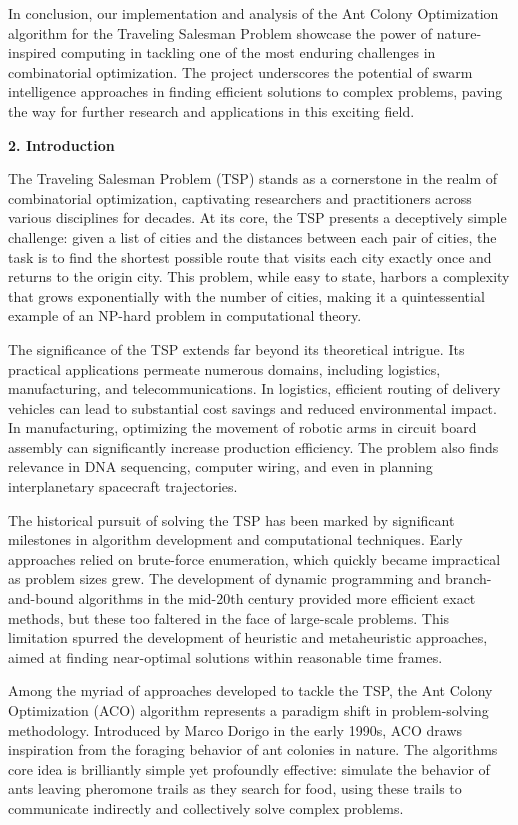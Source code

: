 \documentclass[
]{article}
\begin{document}
In conclusion, our implementation and analysis of the Ant Colony
Optimization algorithm for the Traveling Salesman Problem showcase the
power of nature-inspired computing in tackling one of the most enduring
challenges in combinatorial optimization. The project underscores the
potential of swarm intelligence approaches in finding efficient
solutions to complex problems, paving the way for further research and
applications in this exciting field.

\textbf{2. Introduction}

The Traveling Salesman Problem (TSP) stands as a cornerstone in the
realm of combinatorial optimization, captivating researchers and
practitioners across various disciplines for decades. At its core, the
TSP presents a deceptively simple challenge: given a list of cities and
the distances between each pair of cities, the task is to find the
shortest possible route that visits each city exactly once and returns
to the origin city. This problem, while easy to state, harbors a
complexity that grows exponentially with the number of cities, making it
a quintessential example of an NP-hard problem in computational theory.

The significance of the TSP extends far beyond its theoretical intrigue.
Its practical applications permeate numerous domains, including
logistics, manufacturing, and telecommunications. In logistics,
efficient routing of delivery vehicles can lead to substantial cost
savings and reduced environmental impact. In manufacturing, optimizing
the movement of robotic arms in circuit board assembly can significantly
increase production efficiency. The problem also finds relevance in DNA
sequencing, computer wiring, and even in planning interplanetary
spacecraft trajectories.

The historical pursuit of solving the TSP has been marked by significant
milestones in algorithm development and computational techniques. Early
approaches relied on brute-force enumeration, which quickly became
impractical as problem sizes grew. The development of dynamic
programming and branch-and-bound algorithms in the mid-20th century
provided more efficient exact methods, but these too faltered in the
face of large-scale problems. This limitation spurred the development of
heuristic and metaheuristic approaches, aimed at finding near-optimal
solutions within reasonable time frames.

Among the myriad of approaches developed to tackle the TSP, the Ant
Colony Optimization (ACO) algorithm represents a paradigm shift in
problem-solving methodology. Introduced by Marco Dorigo in the early
1990s, ACO draws inspiration from the foraging behavior of ant colonies
in nature. The algorithm\textquotesingle s core idea is brilliantly
simple yet profoundly effective: simulate the behavior of ants leaving
pheromone trails as they search for food, using these trails to
communicate indirectly and collectively solve complex problems.
\end{document}
